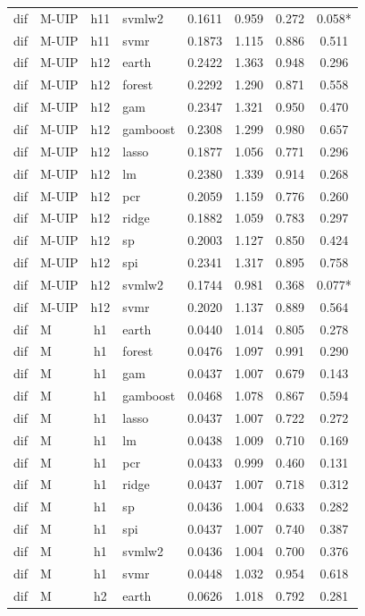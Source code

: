 \begin{ThreePartTable}
\begin{longtable}[t]{llclcccc}
dif & M-UIP & h11 & svmlw2 & 0.1611 & 0.959 & 0.272 & 0.058*\\
dif & M-UIP & h11 & svmr & 0.1873 & 1.115 & 0.886 & 0.511\\
\addlinespace
dif & M-UIP & h12 & earth & 0.2422 & 1.363 & 0.948 & 0.296\\
dif & M-UIP & h12 & forest & 0.2292 & 1.290 & 0.871 & 0.558\\
dif & M-UIP & h12 & gam & 0.2347 & 1.321 & 0.950 & 0.470\\
dif & M-UIP & h12 & gamboost & 0.2308 & 1.299 & 0.980 & 0.657\\
dif & M-UIP & h12 & lasso & 0.1877 & 1.056 & 0.771 & 0.296\\
dif & M-UIP & h12 & lm & 0.2380 & 1.339 & 0.914 & 0.268\\
dif & M-UIP & h12 & pcr & 0.2059 & 1.159 & 0.776 & 0.260\\
dif & M-UIP & h12 & ridge & 0.1882 & 1.059 & 0.783 & 0.297\\
dif & M-UIP & h12 & sp & 0.2003 & 1.127 & 0.850 & 0.424\\
dif & M-UIP & h12 & spi & 0.2341 & 1.317 & 0.895 & 0.758\\
dif & M-UIP & h12 & svmlw2 & 0.1744 & 0.981 & 0.368 & 0.077*\\
dif & M-UIP & h12 & svmr & 0.2020 & 1.137 & 0.889 & 0.564\\
\addlinespace
dif & M & h1 & earth & 0.0440 & 1.014 & 0.805 & 0.278\\
dif & M & h1 & forest & 0.0476 & 1.097 & 0.991 & 0.290\\
dif & M & h1 & gam & 0.0437 & 1.007 & 0.679 & 0.143\\
dif & M & h1 & gamboost & 0.0468 & 1.078 & 0.867 & 0.594\\
dif & M & h1 & lasso & 0.0437 & 1.007 & 0.722 & 0.272\\
dif & M & h1 & lm & 0.0438 & 1.009 & 0.710 & 0.169\\
dif & M & h1 & pcr & 0.0433 & 0.999 & 0.460 & 0.131\\
dif & M & h1 & ridge & 0.0437 & 1.007 & 0.718 & 0.312\\
dif & M & h1 & sp & 0.0436 & 1.004 & 0.633 & 0.282\\
dif & M & h1 & spi & 0.0437 & 1.007 & 0.740 & 0.387\\
dif & M & h1 & svmlw2 & 0.0436 & 1.004 & 0.700 & 0.376\\
dif & M & h1 & svmr & 0.0448 & 1.032 & 0.954 & 0.618\\
\addlinespace
dif & M & h2 & earth & 0.0626 & 1.018 & 0.792 & 0.281\\

\end{longtable}
\end{ThreePartTable}
